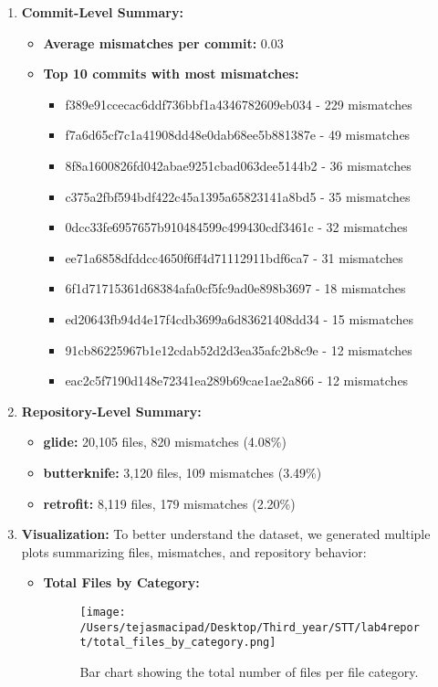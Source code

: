 \documentclass[12pt, a4paper]{report}
\begin{document}
\begin{enumerate}
    \item \textbf{Commit-Level Summary:}  
        \begin{itemize}
            \item \textbf{Average mismatches per commit:} 0.03  
            \item \textbf{Top 10 commits with most mismatches:}  
            \begin{itemize}
                \item f389e91ccecac6ddf736bbf1a4346782609eb034 - 229 mismatches  
                \item f7a6d65cf7c1a41908dd48e0dab68ee5b881387e - 49 mismatches  
                \item 8f8a1600826fd042abae9251cbad063dee5144b2 - 36 mismatches  
                \item c375a2fbf594bdf422c45a1395a65823141a8bd5 - 35 mismatches  
                \item 0dcc33fe6957657b910484599c499430cdf3461c - 32 mismatches  
                \item ee71a6858dfddcc4650f6ff4d71112911bdf6ca7 - 31 mismatches  
                \item 6f1d71715361d68384afa0cf5fc9ad0e898b3697 - 18 mismatches  
                \item ed20643fb94d4e17f4cdb3699a6d83621408dd34 - 15 mismatches  
                \item 91cb86225967b1e12cdab52d2d3ea35afc2b8c9e - 12 mismatches  
                \item eac2c5f7190d148e72341ea289b69cae1ae2a866 - 12 mismatches  
            \end{itemize}
        \end{itemize}
    \item \textbf{Repository-Level Summary:}  
        \begin{itemize}
            \item \textbf{glide:} 20,105 files, 820 mismatches (4.08\%)  
            \item \textbf{butterknife:} 3,120 files, 109 mismatches (3.49\%)  
            \item \textbf{retrofit:} 8,119 files, 179 mismatches (2.20\%)  
        \end{itemize}

    \item \textbf{Visualization:}  
        To better understand the dataset, we generated multiple plots summarizing files, mismatches, and repository behavior:
        \begin{itemize}
            \item \textbf{Total Files by Category:}  
            \begin{figure}[!h]
                \centering
                \texttt{[image: /Users/tejasmacipad/Desktop/Third\_year/STT/lab4report/total\_files\_by\_category.png]}
                \caption{Bar chart showing the total number of files per file category.}
            \end{figure}


\end{itemize}
\end{enumerate}
\end{document}
